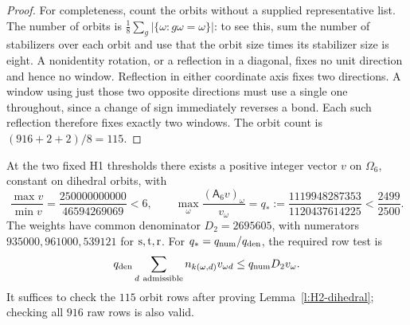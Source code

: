 \begin{proof}
For completeness, count the orbits without a supplied representative
list. The number of orbits is
\(\frac18\sum_g|\{\omega:g\omega=\omega\}|\): to see this,
sum the number of stabilizers over each orbit and use that the orbit
size times its stabilizer size is eight. A nonidentity rotation, or
a reflection in a diagonal, fixes no unit direction and hence no
window. Reflection in either coordinate axis fixes two directions.
A window using just those two opposite directions must use a single
one throughout, since a change of sign immediately reverses a bond.
Each such reflection therefore fixes exactly two windows. The orbit
count is \((916+2+2)/8=115\).
\end{proof}

\begin{proposition}\label{p:H2-test}
At the two fixed H1 thresholds there exists a positive integer
vector \(v\) on \(\Omega_6\), constant on dihedral orbits, with
\[
 \frac{\max v}{\min v}=\frac{250000000000}{46594269069}<6,\qquad
 \max_\omega\frac{(\mathsf A_6v)_\omega}{v_\omega}
       =q_*:=\frac{1119948287353}{1120437614225}<\frac{2499}{2500}.
\]
The weights have common denominator \(D_2=2695605\), with
numerators \(935000,961000,539121\) for \({\rm s},{\rm t},{\rm r}\).
For \(q_*=q_{\rm num}/q_{\rm den}\), the required row test is
\[
 q_{\rm den}\sum_{d\ {\rm admissible}}n_{k(\omega,d)}v_{\omega d}
          \le q_{\rm num}D_2v_\omega .
\]
It suffices to check the \(115\) orbit rows after proving
Lemma~\ref{l:H2-dihedral}; checking all \(916\) raw rows is also valid.
\end{proposition}

